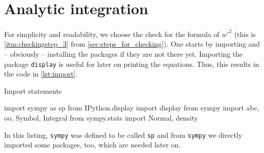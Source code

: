 \section{Analytic integration}\label{sec:anaintsympy}

For simplicity and readability, we choose the check for the formula of $\overline{w'^2}$
(this is \cref{itm:checkingstep_3} from \cref{sec:steps_for_checking}).
One starts by importing and -- obviously -- installing the packages if they are not there yet.
Importing the package \texttt{display} is useful for later on printing the equations.
Thus, this results in the code in \cref{lst:import}.
\begin{listing}[!ht]
    \caption{Import statements}
    \label{lst:import}
    \begin{pythoncode}
        import sympy as sp
        from IPython.display import display
        from sympy import abc, oo, Symbol, Integral
        from sympy.stats import Normal, density
    \end{pythoncode}
\end{listing}
In this listing,
\texttt{sympy} was defined to be called \texttt{sp}
and from \texttt{sympy} we directly imported some packages,
too, which are needed later on.

